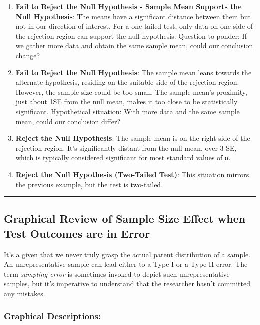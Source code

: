 \documentclass[
  letterpaper,
  DIV=11,
  numbers=noendperiod]{scrartcl}
\begin{document}
\begin{enumerate}
\def\labelenumi{\arabic{enumi}.}
\item
  \textbf{Fail to Reject the Null Hypothesis - Sample Mean Supports the
  Null Hypothesis}: The means have a significant distance between them
  but not in our direction of interest. For a one-tailed test, only data
  on one side of the rejection region can support the null hypothesis.
  Question to ponder: If we gather more data and obtain the same sample
  mean, could our conclusion change?
\item
  \textbf{Fail to Reject the Null Hypothesis}: The sample mean leans
  towards the alternate hypothesis, residing on the suitable side of the
  rejection region. However, the sample size could be too small. The
  sample mean's proximity, just about 1SE from the null mean, makes it
  too close to be statistically significant. Hypothetical situation:
  With more data and the same sample mean, could our conclusion differ?
\item
  \textbf{Reject the Null Hypothesis}: The sample mean is on the right
  side of the rejection region. It's significantly distant from the null
  mean, over 3 SE, which is typically considered significant for most
  standard values of α.
\item
  \textbf{Reject the Null Hypothesis (Two-Tailed Test)}: This situation
  mirrors the previous example, but the test is two-tailed.
\end{enumerate}

\begin{center}\rule{0.5\linewidth}{0.5pt}\end{center}

\hypertarget{graphical-review-of-sample-size-effect-when-test-outcomes-are-in-error}{%
\subsection{Graphical Review of Sample Size Effect when Test Outcomes
are in
Error}\label{graphical-review-of-sample-size-effect-when-test-outcomes-are-in-error}}

It's a given that we never truly grasp the actual parent distribution of
a sample. An unrepresentative sample can lead either to a Type I or a
Type II error. The term \emph{sampling error} is sometimes invoked to
depict such unrepresentative samples, but it's imperative to understand
that the researcher hasn't committed any mistakes.

\hypertarget{graphical-descriptions-1}{%
\subsubsection{Graphical Descriptions:}\label{graphical-descriptions-1}}
\end{document}
